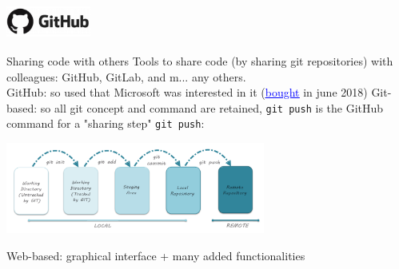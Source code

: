 \begin{frame}[containsverbatim]
\frametitle{\includegraphics[height=1cm]{shared/logo-github.png}}
\begin{block}{Sharing code with others}
Tools to share code (by sharing git repositories) with colleagues: GitHub, GitLab, and m... any others.\\
GitHub: so used that Microsoft was interested in it (\href{https://blogs.microsoft.com/blog/2018/06/04/microsoft-github-empowering-developers/}{\textcolor{blue}{\underline{bought}}} in june 2018)
Git-based: so all git concept and command are retained, \verb|git push| is the GitHub command for a "sharing step" \verb|git push|:
\begin{center}
\includegraphics[height=3cm]{05_history/Images/FAIR_git-4push.png}
\end{center}
Web-based: graphical interface + many added functionalities
\end{block}
\end{frame}

